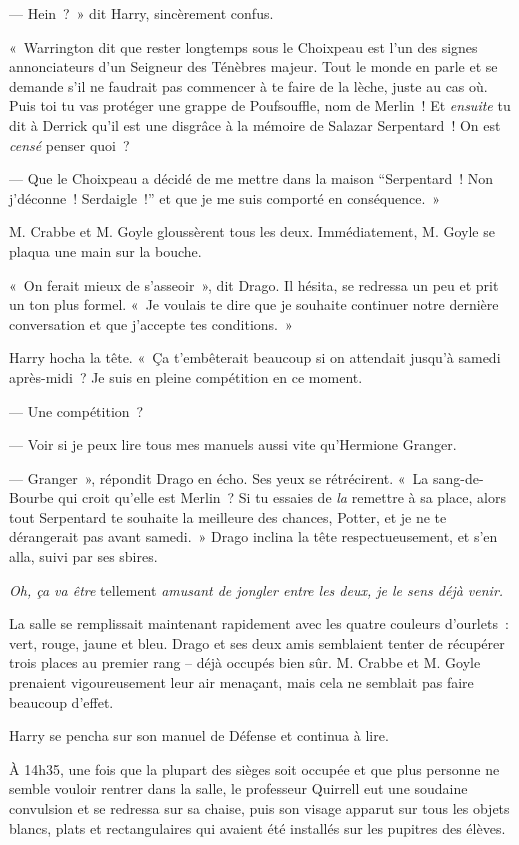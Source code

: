 --- Hein~?~» dit Harry, sincèrement confus.

«~Warrington dit que rester longtemps sous le Choixpeau est l'un des signes annonciateurs d'un Seigneur des Ténèbres majeur.
Tout le monde en parle et se demande s'il ne faudrait pas commencer à te faire de la lèche, juste au cas où.
Puis toi tu vas protéger une grappe de Poufsouffle, nom de Merlin~!
Et \emph{ensuite} tu dit à Derrick qu'il est une disgrâce à la mémoire de Salazar Serpentard~!
On est \emph{censé} penser quoi~?

--- Que le Choixpeau a décidé de me mettre dans la maison “Serpentard~! Non j'déconne~! Serdaigle~!” et que je me suis comporté en conséquence.~»

M. Crabbe et M. Goyle gloussèrent tous les deux. Immédiatement, M. Goyle se plaqua une main sur la bouche.

«~On ferait mieux de s'asseoir~», dit Drago.
Il hésita, se redressa un peu et prit un ton plus formel.
«~Je voulais te dire que je souhaite continuer notre dernière conversation et que j'accepte tes conditions.~»

Harry hocha la tête.
«~Ça t'embêterait beaucoup si on attendait jusqu'à samedi après-midi~?
Je suis en pleine compétition en ce moment.

--- Une compétition~?

--- Voir si je peux lire tous mes manuels aussi vite qu'Hermione Granger.

--- Granger~», répondit Drago en écho.
Ses yeux se rétrécirent.
«~La sang-de-Bourbe qui croit qu'elle est Merlin~?
Si tu essaies de \emph{la} remettre à sa place, alors tout Serpentard te souhaite la meilleure des chances, Potter, et je ne te dérangerait pas avant samedi.~»
Drago inclina la tête respectueusement, et s'en alla, suivi par ses sbires.

\emph{Oh, ça va être} tellement \emph{amusant de jongler entre les deux, je le sens déjà venir.}

La salle se remplissait maintenant rapidement avec les quatre couleurs d'ourlets~: vert, rouge, jaune et bleu.
Drago et ses deux amis semblaient tenter de récupérer trois places au premier rang -- déjà occupés bien sûr.
M. Crabbe et M. Goyle prenaient vigoureusement leur air menaçant, mais cela ne semblait pas faire beaucoup d'effet.

Harry se pencha sur son manuel de Défense et continua à lire.

\later

À 14h35, une fois que la plupart des sièges soit occupée et que plus personne ne semble vouloir rentrer dans la salle, le professeur Quirrell eut une soudaine convulsion et se redressa sur sa chaise, puis son visage apparut sur tous les objets blancs, plats et rectangulaires qui avaient été installés sur les pupitres des élèves.

